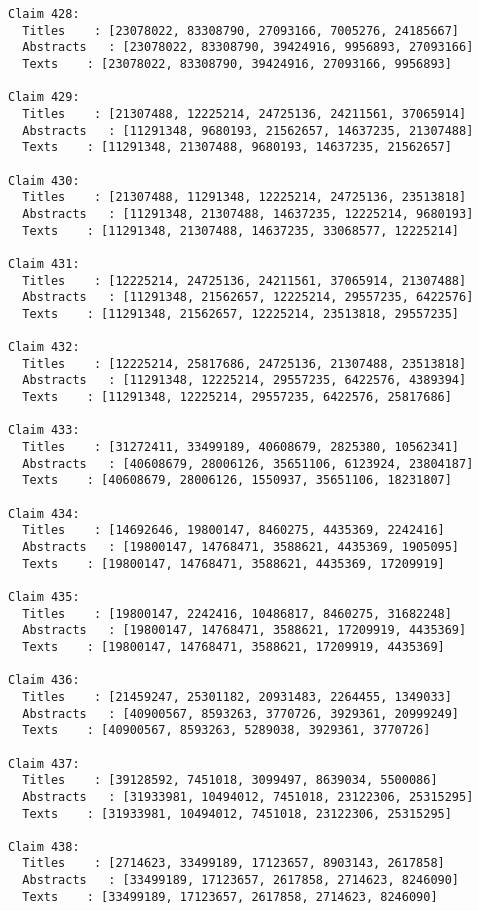 \documentclass[11pt]{article}
\begin{document}
\begin{Verbatim}[commandchars=\\\{\}]
Claim 428:
  Titles    : [23078022, 83308790, 27093166, 7005276, 24185667]
  Abstracts   : [23078022, 83308790, 39424916, 9956893, 27093166]
  Texts    : [23078022, 83308790, 39424916, 27093166, 9956893]

Claim 429:
  Titles    : [21307488, 12225214, 24725136, 24211561, 37065914]
  Abstracts   : [11291348, 9680193, 21562657, 14637235, 21307488]
  Texts    : [11291348, 21307488, 9680193, 14637235, 21562657]

Claim 430:
  Titles    : [21307488, 11291348, 12225214, 24725136, 23513818]
  Abstracts   : [11291348, 21307488, 14637235, 12225214, 9680193]
  Texts    : [11291348, 21307488, 14637235, 33068577, 12225214]

Claim 431:
  Titles    : [12225214, 24725136, 24211561, 37065914, 21307488]
  Abstracts   : [11291348, 21562657, 12225214, 29557235, 6422576]
  Texts    : [11291348, 21562657, 12225214, 23513818, 29557235]

Claim 432:
  Titles    : [12225214, 25817686, 24725136, 21307488, 23513818]
  Abstracts   : [11291348, 12225214, 29557235, 6422576, 4389394]
  Texts    : [11291348, 12225214, 29557235, 6422576, 25817686]

Claim 433:
  Titles    : [31272411, 33499189, 40608679, 2825380, 10562341]
  Abstracts   : [40608679, 28006126, 35651106, 6123924, 23804187]
  Texts    : [40608679, 28006126, 1550937, 35651106, 18231807]

Claim 434:
  Titles    : [14692646, 19800147, 8460275, 4435369, 2242416]
  Abstracts   : [19800147, 14768471, 3588621, 4435369, 1905095]
  Texts    : [19800147, 14768471, 3588621, 4435369, 17209919]

Claim 435:
  Titles    : [19800147, 2242416, 10486817, 8460275, 31682248]
  Abstracts   : [19800147, 14768471, 3588621, 17209919, 4435369]
  Texts    : [19800147, 14768471, 3588621, 17209919, 4435369]

Claim 436:
  Titles    : [21459247, 25301182, 20931483, 2264455, 1349033]
  Abstracts   : [40900567, 8593263, 3770726, 3929361, 20999249]
  Texts    : [40900567, 8593263, 5289038, 3929361, 3770726]

Claim 437:
  Titles    : [39128592, 7451018, 3099497, 8639034, 5500086]
  Abstracts   : [31933981, 10494012, 7451018, 23122306, 25315295]
  Texts    : [31933981, 10494012, 7451018, 23122306, 25315295]

Claim 438:
  Titles    : [2714623, 33499189, 17123657, 8903143, 2617858]
  Abstracts   : [33499189, 17123657, 2617858, 2714623, 8246090]
  Texts    : [33499189, 17123657, 2617858, 2714623, 8246090]


\end{Verbatim}
\end{document}
